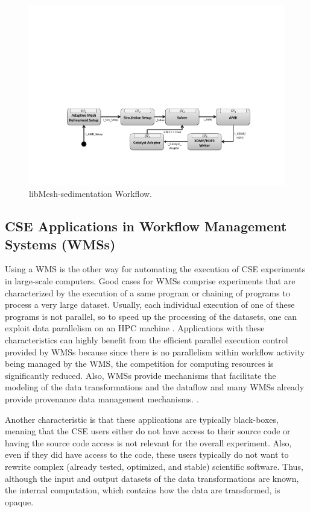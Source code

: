 \begin{figure}[H]
    \centering
    \includegraphics[width=\textwidth,keepaspectratio]{img/libMesh-workflow.pdf}
    \caption{libMesh-sedimentation Workflow.}
    \label{fig:libmesh}
\end{figure}




\subsection{CSE Applications in Workflow Management Systems (WMSs)}
\label{subsec_blackbox}

Using a WMS is the other way for automating the execution of CSE experiments in large-scale computers. Good cases for WMSs
comprise experiments that are characterized by the execution of a same program or chaining of programs to process a very large dataset. Usually, each individual execution of one of these programs is not parallel, so to speed up the processing of the datasets, one can exploit data parallelism on an HPC machine \cite{F.daSilva2017characterization}.
Applications with these characteristics can highly benefit from the
efficient parallel execution control provided by WMSs because since there is no parallelism within workflow activity being managed by the WMS, the competition for computing resources is significantly reduced.
Also, WMSs provide mechanisms that facilitate the modeling of the data transformations and the dataflow and many WMSs already provide provenance data management mechanisms. \cite{Mattoso2015Dynamic}.

Another characteristic is that these applications are typically black-boxes, meaning that the CSE users either do not have access to their source code or having the source code access is not relevant for the overall experiment. Also, even if they did have access to the code, these users typically do not want to rewrite complex (already tested,
optimized, and stable) scientific software.
Thus, although the input and output datasets of the data transformations are known,
the internal computation, which contains how the data are transformed, is opaque.

